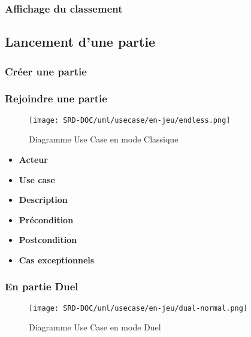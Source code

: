\documentclass{article}
\begin{document}
\subsubsection{Affichage du classement}

\subsection{Lancement d'une partie}

\subsubsection{Créer une partie}

\subsubsection{Rejoindre une partie}

\begin{figure}[htbp]
    \centering
    \texttt{[image: SRD-DOC/uml/usecase/en-jeu/endless.png]}
    \caption{Diagramme Use Case en mode Classique}
    \label{fig:Classique}
\end{figure}

\begin{itemize}
    \item \textbf{Acteur}
    \item \textbf{Use case}
    \item \textbf{Description}
    \item \textbf{Précondition}
    \item \textbf{Postcondition}
    \item \textbf{Cas exceptionnels}
\end{itemize}

\subsubsection{En partie Duel}

\begin{figure}[H]
    \centering
    \texttt{[image: SRD-DOC/uml/usecase/en-jeu/dual-normal.png]}
    \caption{Diagramme Use Case en mode Duel}
    \label{fig:Duel}
\end{figure}
\end{document}
